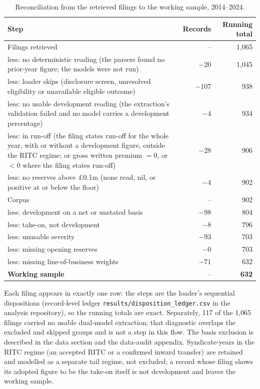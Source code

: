 \begin{table}[htbp]
\centering
\begin{threeparttable}
\caption{Reconciliation from the retrieved filings to the working sample, 2014--2024.}
\label{tab:reconcile}
\begin{tabular}{lrr}
\toprule
\headrow Step & Records & Running total \\
\midrule
Filings retrieved & -- & 1{,}065 \\
\quad less: no deterministic reading (the parsers found no prior-year figure; the models were not run) & $-20$ & 1{,}045 \\
\quad less: loader skips (disclosure screen, unresolved eligibility or unavailable eligible outcome) & $-107$ & 938 \\
\quad less: no usable development reading (the extraction's validation failed and no model carries a development percentage) & $-4$ & 934 \\
\quad less: in run-off (the filing states run-off for the whole year, with or without a development figure, outside the RITC regime; or gross written premium $=0$, or $<0$ where the filing states run-off) & $-28$ & 906 \\
\quad less: no reserves above \pounds0.1m (none read, nil, or positive at or below the floor) & $-4$ & 902 \\
Corpus & -- & 902 \\
\quad less: development on a net or unstated basis & $-98$ & 804 \\
\quad less: take-on, not development & $-8$ & 796 \\
\quad less: unusable severity & $-93$ & 703 \\
\quad less: missing opening reserves & $-0$ & 703 \\
\quad less: missing line-of-business weights & $-71$ & 632 \\
\textbf{Working sample} & -- & \textbf{632} \\
\bottomrule
\end{tabular}
\begin{tablenotes}[hang]
\item[] Each filing appears in exactly one row: the steps are the loader's sequential dispositions (record-level ledger \texttt{results/disposition\_ledger.csv} in the analysis repository), so the running totals are exact. Separately, 117 of the 1{,}065 filings carried no usable dual-model extraction; that diagnostic overlaps the excluded and skipped groups and is not a step in this flow. The basis exclusion is described in the data section and the data-audit appendix. Syndicate-years in the RITC regime (an accepted RITC or a confirmed inward transfer) are retained and modelled as a separate tail regime, not excluded; a record whose filing shows its adopted figure to be the take-on itself is not development and leaves the working sample.
\end{tablenotes}
\end{threeparttable}
\end{table}
